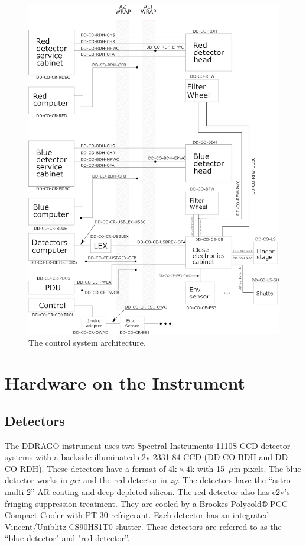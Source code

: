 \documentclass{article}
\newcommand{\micron}{\mbox{$\mu$m}}
\begin{document}
\begin{figure}[bp]
\begin{center}
\includegraphics[width=0.9\linewidth]{figures/electronics-architecture.png}
\end{center}
\caption{The control system architecture.}
\label{figure:electronics-architecture}
\end{figure}


\clearpage
\section{Hardware on the Instrument}

\subsection{Detectors}
\label{section:detectors}

The DDRAGO instrument uses two Spectral Instruments 1110S CCD detector systems with a backside-illuminated e2v 2331-84 CCD (DD-CO-BDH and DD-CO-RDH). These detectors have a format of $4\mathrm{k}\times4\mathrm{k}$ with 15~{\micron} pixels. The blue detector works in $gri$ and the red detector in $zy$. The detectors have the “astro multi-2” AR coating and deep-depleted silicon. The red detector also has e2v's fringing-suppression treatment. They are cooled by a Brookes Polycold® PCC Compact Cooler with PT-30 refrigerant. Each detector has an integrated Vincent/Uniblitz CS90HS1T0 shutter. These detectors are referred to as the “blue detector" and "red detector”.
\end{document}
